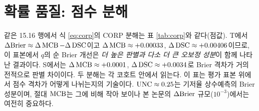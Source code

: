 \section{확률 품질: 점수 분해}
\label{sec:val-corp}

같은 15.16 행에서 식 \eqref{eq:corp}의 CORP 분해는 표 \ref{tab:corp}와 같다(점값). T에서 $\Delta\mathrm{Brier} \approx \Delta\operatorname{MCB} - \Delta\operatorname{DSC}$이고 $\Delta\operatorname{MCB} \approx +0.00033$, $\Delta\operatorname{DSC} \approx +0.00406$이므로, 이 표본에서 $q$의 순 Brier 개선은 \emph{더 높은 판별과 다소 더 큰 오보정 성분}이 함께 나타난 결과이다. S에서는 $\Delta\operatorname{MCB} \approx +0.0001$, $\Delta\operatorname{DSC} \approx +0.0034$로 Brier 격차가 거의 전적으로 판별 차이이다. 두 분해는 각 코호트 안에서 읽는다. 이 표는 평가 표본 위에서 점수 격차가 어떻게 나뉘는지의 기술이다. $\operatorname{UNC} \approx 0.25$는 기저율 상수예측의 Brier 성분이며, 절대 $\operatorname{MCB}$는 그에 비해 작아 보이나 본 논문의 $\Delta\mathrm{Brier}$ 규모($10^{-3}$)에서는 여전히 중요하다.


